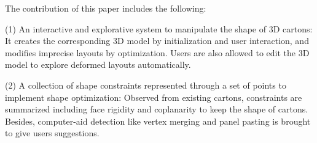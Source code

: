 The contribution of this paper includes the following:

(1) An interactive and explorative system to manipulate the shape of 3D cartons: It creates the corresponding 3D model by initialization and user interaction, and modifies imprecise layouts by optimization. Users are also allowed to edit the 3D model to explore deformed layouts automatically.

(2) A collection of shape constraints represented through a set of points to implement shape optimization: Observed from existing cartons, constraints are summarized including face rigidity and coplanarity to keep the shape of cartons. Besides, computer-aid detection like vertex merging and panel pasting is brought to give users suggestions. 